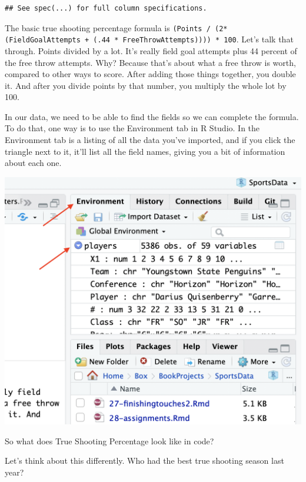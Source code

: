 \documentclass[]{book}
\newenvironment{Shaded}{\begin{snugshade}}{\end{snugshade}}
\newcommand{\DataTypeTok}[1]{\textcolor[rgb]{0.13,0.29,0.53}{#1}}
\newcommand{\DecValTok}[1]{\textcolor[rgb]{0.00,0.00,0.81}{#1}}
\newcommand{\KeywordTok}[1]{\textcolor[rgb]{0.13,0.29,0.53}{\textbf{#1}}}
\newcommand{\NormalTok}[1]{#1}
\newcommand{\OperatorTok}[1]{\textcolor[rgb]{0.81,0.36,0.00}{\textbf{#1}}}
\newcommand{\StringTok}[1]{\textcolor[rgb]{0.31,0.60,0.02}{#1}}
\begin{document}
\begin{verbatim}
## See spec(...) for full column specifications.
\end{verbatim}

The basic true shooting percentage formula is \texttt{(Points\ /\ (2*(FieldGoalAttempts\ +\ (.44\ *\ FreeThrowAttempts))))\ *\ 100}. Let's talk that through. Points divided by a lot. It's really field goal attempts plus 44 percent of the free throw attempts. Why? Because that's about what a free throw is worth, compared to other ways to score. After adding those things together, you double it. And after you divide points by that number, you multiply the whole lot by 100.

In our data, we need to be able to find the fields so we can complete the formula. To do that, one way is to use the Environment tab in R Studio. In the Environment tab is a listing of all the data you've imported, and if you click the triangle next to it, it'll list all the field names, giving you a bit of information about each one.

\includegraphics[width=18.14in]{images/environment}

So what does True Shooting Percentage look like in code?

Let's think about this differently. Who had the best true shooting season last year?

\begin{Shaded}
\end{Shaded}
\end{document}
